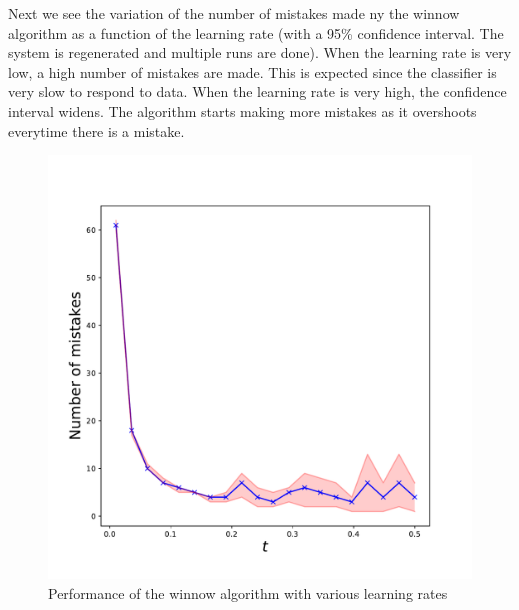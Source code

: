 \documentclass{article}
\begin{document}
Next we see the variation of the number of mistakes made ny the winnow algorithm as a function of the learning rate (with a 95\% confidence interval. The system is regenerated and multiple runs are done). When the learning rate is very low, a high number of mistakes are made. This is expected since the classifier is very slow to respond to data. When the learning rate is very high, the confidence interval widens. The algorithm starts making more mistakes as it overshoots everytime there is a mistake.
\begin{figure}[h!]
\centering
\includegraphics[scale=0.4]{q6b}
\caption{Performance of the winnow algorithm with various learning rates}
\end{figure}
\clearpage
\end{document}
